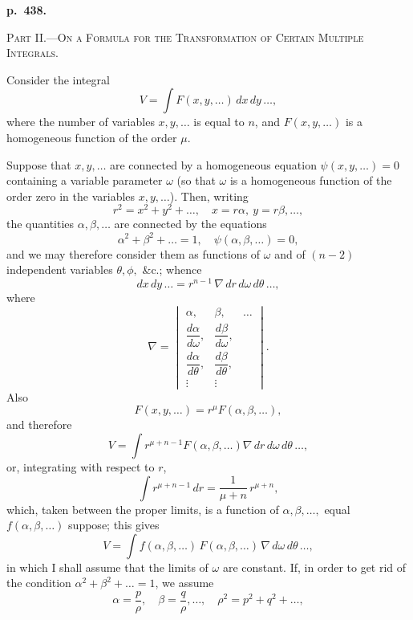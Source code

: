 \documentclass[11pt]{article}
\begin{document}
\bigskip
\noindent\textbf{p.~438.}
\begin{center}\textsc{Part II.---On a Formula for the Transformation of Certain Multiple Integrals.}\end{center}

Consider the integral
\[ V = \int F(x, y, \ldots)\,dx\,dy\,\ldots, \]
where the number of variables $x, y, \ldots$ is equal to $n$, and $F(x, y, \ldots)$ is a homogeneous function of the order $\mu$.

Suppose that $x, y, \ldots$ are connected by a homogeneous equation $\psi(x, y, \ldots) = 0$ containing a variable parameter $\omega$ (so that $\omega$ is a homogeneous function of the order zero in the variables $x, y, \ldots$). Then, writing
\[ r^2 = x^2 + y^2 + \ldots,\quad x = r\alpha,\ y = r\beta,\ldots, \]
the quantities $\alpha, \beta, \ldots$ are connected by the equations
\[ \alpha^2 + \beta^2 + \ldots = 1,\quad \psi(\alpha, \beta, \ldots) = 0, \]
and we may therefore consider them as functions of $\omega$ and of $(n-2)$ independent variables $\theta, \phi,$ \&c.; whence
\[ dx\,dy\,\ldots = r^{n-1}\,\nabla\,dr\,d\omega\,d\theta\,\ldots, \]
where
\[ \nabla = \begin{vmatrix} \alpha,&\beta,&\ldots\\[2pt] \dfrac{d\alpha}{d\omega},&\dfrac{d\beta}{d\omega},&\\[6pt] \dfrac{d\alpha}{d\theta},&\dfrac{d\beta}{d\theta},&\\ \vdots&\vdots& \end{vmatrix}. \]
Also
\[ F(x, y, \ldots) = r^\mu F(\alpha, \beta, \ldots), \]
and therefore
\[ V = \int r^{\mu + n - 1} F(\alpha, \beta, \ldots)\nabla\,dr\,d\omega\,d\theta\,\ldots, \]
or, integrating with respect to $r$,
\[ \int r^{\mu + n - 1}\,dr = \frac{1}{\mu + n}\,r^{\mu + n}, \]
which, taken between the proper limits, is a function of $\alpha, \beta, \ldots,$ equal $f(\alpha, \beta, \ldots)$ suppose; this gives
\[ V = \int f(\alpha, \beta, \ldots)\,F(\alpha, \beta, \ldots)\,\nabla\,d\omega\,d\theta\,\ldots, \]
in which I shall assume that the limits of $\omega$ are constant. If, in order to get rid of the condition $\alpha^2 + \beta^2 + \ldots = 1$, we assume
\[ \alpha = \frac{p}{\rho},\quad \beta = \frac{q}{\rho},\ldots,\quad \rho^2 = p^2 + q^2 + \ldots, \]
\end{document}
